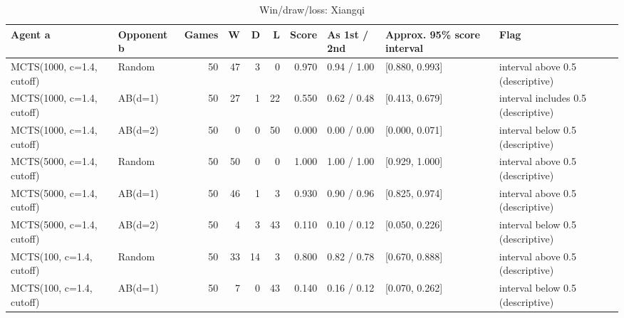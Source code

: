 \begin{table}[!t]
\centering
\caption{Win/draw/loss: Xiangqi}
\label{tab:wdl_xiangqi}
\small
\begin{tabular}{llrrrrrlll}
\toprule
Agent a & Opponent b & Games & W & D & L & Score & As 1st / 2nd & Approx. 95\% score interval & Flag \\
\midrule
MCTS(1000, c=1.4, cutoff) & Random & 50 & 47 & 3 & 0 & 0.970 & 0.94 / 1.00 & [0.880, 0.993] & interval above 0.5 (descriptive) \\
MCTS(1000, c=1.4, cutoff) & AB(d=1) & 50 & 27 & 1 & 22 & 0.550 & 0.62 / 0.48 & [0.413, 0.679] & interval includes 0.5 (descriptive) \\
MCTS(1000, c=1.4, cutoff) & AB(d=2) & 50 & 0 & 0 & 50 & 0.000 & 0.00 / 0.00 & [0.000, 0.071] & interval below 0.5 (descriptive) \\
MCTS(5000, c=1.4, cutoff) & Random & 50 & 50 & 0 & 0 & 1.000 & 1.00 / 1.00 & [0.929, 1.000] & interval above 0.5 (descriptive) \\
MCTS(5000, c=1.4, cutoff) & AB(d=1) & 50 & 46 & 1 & 3 & 0.930 & 0.90 / 0.96 & [0.825, 0.974] & interval above 0.5 (descriptive) \\
MCTS(5000, c=1.4, cutoff) & AB(d=2) & 50 & 4 & 3 & 43 & 0.110 & 0.10 / 0.12 & [0.050, 0.226] & interval below 0.5 (descriptive) \\
MCTS(100, c=1.4, cutoff) & Random & 50 & 33 & 14 & 3 & 0.800 & 0.82 / 0.78 & [0.670, 0.888] & interval above 0.5 (descriptive) \\
MCTS(100, c=1.4, cutoff) & AB(d=1) & 50 & 7 & 0 & 43 & 0.140 & 0.16 / 0.12 & [0.070, 0.262] & interval below 0.5 (descriptive) \\
\bottomrule
\end{tabular}
\end{table}
